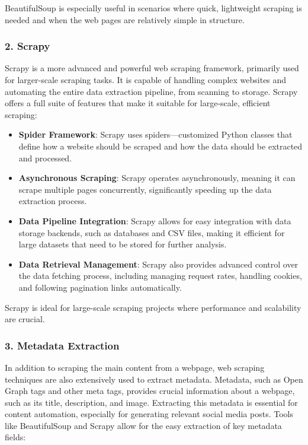 BeautifulSoup is especially useful in scenarios where quick, lightweight scraping is needed and when the web pages are relatively simple in structure.

\subsubsection{2. Scrapy}

Scrapy is a more advanced and powerful web scraping framework, primarily used for larger-scale scraping tasks. It is capable of handling complex websites and automating the entire data extraction pipeline, from scanning to storage. Scrapy offers a full suite of features that make it suitable for large-scale, efficient scraping:

\begin{itemize}
    \item \textbf{Spider Framework}: Scrapy uses spiders—customized Python classes that define how a website should be scraped and how the data should be extracted and processed.
    \item \textbf{Asynchronous Scraping}: Scrapy operates asynchronously, meaning it can scrape multiple pages concurrently, significantly speeding up the data extraction process.
    \item \textbf{Data Pipeline Integration}: Scrapy allows for easy integration with data storage backends, such as databases and CSV files, making it efficient for large datasets that need to be stored for further analysis.
    \item \textbf{Data Retrieval Management}: Scrapy also provides advanced control over the data fetching process, including managing request rates, handling cookies, and following pagination links automatically.
\end{itemize}

Scrapy is ideal for large-scale scraping projects where performance and scalability are crucial.

\subsubsection{3. Metadata Extraction}

In addition to scraping the main content from a webpage, web scraping techniques are also extensively used to extract metadata. Metadata, such as Open Graph tags and other meta tags, provides crucial information about a webpage, such as its title, description, and image. Extracting this metadata is essential for content automation, especially for generating relevant social media posts. Tools like BeautifulSoup and Scrapy allow for the easy extraction of key metadata fields:

